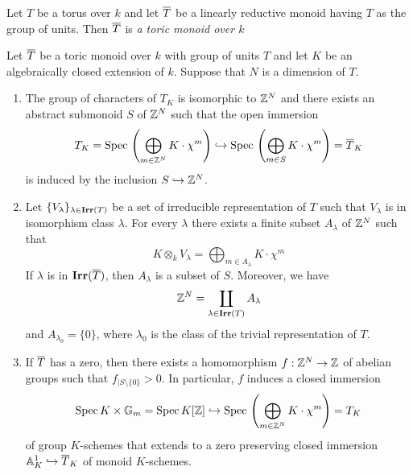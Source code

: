 \begin{definition}
Let $T$ be a torus over $k$ and let $\overline{T}$ be a linearly reductive monoid having $T$ as the group of units. Then $\overline{T}$ is \textit{a toric monoid over $k$}
\end{definition}

\begin{theorem}\label{theorem:toric_monoids_properties_Kempf_torus}
Let $\overline{T}$ be a toric monoid over $k$ with group of units $T$ and let $K$ be an algebraically closed extension of $k$. Suppose that $N$ is a dimension of $T$.
\begin{enumerate}[label=\emph{\textbf{(\arabic*)}}, leftmargin=1.5em]
\item The group of characters of $T_K$ is isomorphic to ${\mathbb Z}^N$ and there exists an abstract submonoid $S$ of ${\mathbb Z}^N$ such that the open immersion
$$T_K = \mathrm{Spec}\,\left(\bigoplus_{m\in {\mathbb Z}^N}K\cdot \chi^m\right) \hookrightarrow \mathrm{Spec}\,\left(\bigoplus_{m\in S}K\cdot \chi^m\right) = \overline{T}_K$$
is induced by the inclusion $S\hookrightarrow {\mathbb Z}^N$.
\item Let $\{V_{\lambda}\}_{\lambda\in \mathbf{Irr}(T)}$ be a set of irreducible representation of $T$ such that $V_{\lambda}$ is in isomorphism class $\lambda$. For every $\lambda$ there exists a finite subset $A_{\lambda}$ of ${\mathbb Z}^N$ such that
$$K\otimes_kV_{\lambda} = \bigoplus_{m\in A_{\lambda}}K\cdot \chi^m$$
If $\lambda$ is in  $\mathbf{Irr}(\overline{T})$, then $A_{\lambda}$ is a subset of $S$. Moreover, we have
$${\mathbb Z}^N = \coprod_{\lambda\in \mathbf{Irr}(T)}A_{\lambda}$$
and $A_{\lambda_0} = \{0\}$, where $\lambda_0$ is the class of the trivial representation of $T$.
\item If $\overline{T}$ has a zero, then there exists a homomorphism $f:{\mathbb Z}^N\rightarrow {\mathbb Z}$ of abelian groups such that $f_{\mid S\setminus \{0\}}>0$. In particular, $f$ induces a closed immersion
$$\mathrm{Spec}\, K\times \mathbb{G}_{m} = \mathrm{Spec}\, K[{\mathbb Z}]\hookrightarrow \mathrm{Spec}\, \left(\bigoplus_{m\in {\mathbb Z}^N}K\cdot \chi^m\right) = T_K$$
of group $K$-schemes that extends to a zero preserving closed immersion $\mathbb{A}^1_K\hookrightarrow \overline{T}_K$ of monoid $K$-schemes.
\end{enumerate}
\end{theorem}
